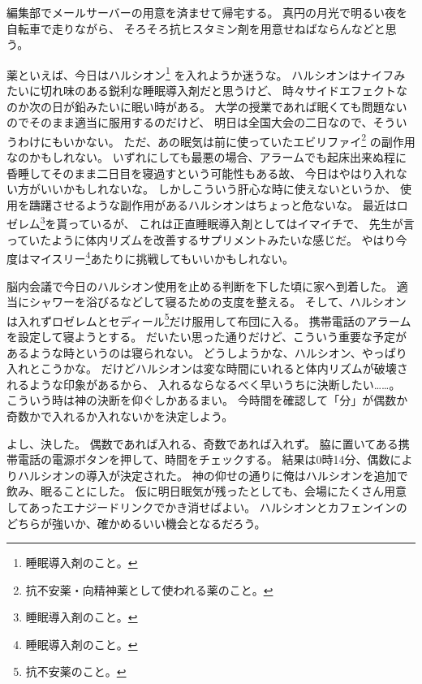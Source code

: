 編集部でメールサーバーの用意を済ませて帰宅する。
真円の月光で明るい夜を自転車で走りながら、
そろそろ抗ヒスタミン剤を用意せねばならんなどと思う。

薬といえば、今日はハルシオン\footnote{睡眠導入剤のこと。}%
を入れようか迷うな。
ハルシオンはナイフみたいに切れ味のある鋭利な睡眠導入剤だと思うけど、
時々サイドエフェクトなのか次の日が鉛みたいに眠い時がある。
大学の授業であれば眠くても問題ないのでそのまま適当に服用するのだけど、
明日は全国大会の二日なので、そういうわけにもいかない。
ただ、あの眠気は前に使っていたエビリファイ\footnote{抗不安薬・向精神薬として使われる薬のこと。}%
の副作用なのかもしれない。
いずれにしても最悪の場合、アラームでも起床出来ぬ程に昏睡してそのまま二日目を寝過すという可能性もある故、
今日はやはり入れない方がいいかもしれないな。
しかしこういう肝心な時に使えないというか、
使用を躊躇させるような副作用があるハルシオンはちょっと危ないな。
最近はロゼレム\footnote{睡眠導入剤のこと。}を貰っているが、
これは正直睡眠導入剤としてはイマイチで、
先生が言っていたように体内リズムを改善するサプリメントみたいな感じだ。
やはり今度はマイスリー\footnote{睡眠導入剤のこと。}あたりに挑戦してもいいかもしれない。

脳内会議で今日のハルシオン使用を止める判断を下した頃に家へ到着した。
適当にシャワーを浴びるなどして寝るための支度を整える。
そして、ハルシオンは入れずロゼレムとセディール\footnote{抗不安薬のこと。}だけ服用して布団に入る。
携帯電話のアラームを設定して寝ようとする。
だいたい思った通りだけど、こういう重要な予定があるような時というのは寝られない。
どうしようかな、ハルシオン、やっぱり入れとこうかな。
だけどハルシオンは変な時間にいれると体内リズムが破壊されるような印象があるから、
入れるならなるべく早いうちに決断したい……。
こういう時は神の決断を仰ぐしかあるまい。
今時間を確認して「分」が偶数か奇数かで入れるか入れないかを決定しよう。

よし、決した。
偶数であれば入れる、奇数であれば入れず。
脇に置いてある携帯電話の電源ボタンを押して、時間をチェックする。
結果は0時14分、偶数によりハルシオンの導入が決定された。
神の仰せの通りに俺はハルシオンを追加で飲み、眠ることにした。
仮に明日眠気が残ったとしても、会場にたくさん用意してあったエナジードリンクでかき消せばよい。
ハルシオンとカフェンインのどちらが強いか、確かめるいい機会となるだろう。
